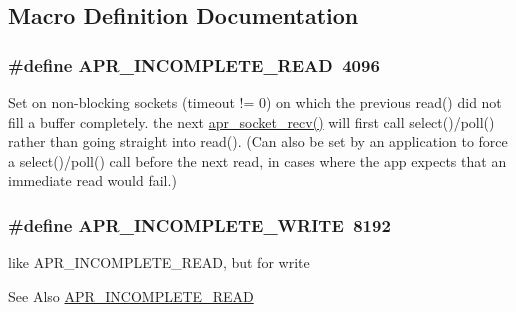\subsection{Macro Definition Documentation}
\hypertarget{group__apr__sockopt_ga73b6c80791c5148c2a416e03a8a1ff8a}{
\subsubsection[{A\-P\-R\-\_\-\-I\-N\-C\-O\-M\-P\-L\-E\-T\-E\-\_\-\-R\-E\-A\-D}]{\setlength{\rightskip}{0pt plus 5cm}\#define A\-P\-R\-\_\-\-I\-N\-C\-O\-M\-P\-L\-E\-T\-E\-\_\-\-R\-E\-A\-D~4096}}\label{group__apr__sockopt_ga73b6c80791c5148c2a416e03a8a1ff8a}
Set on non-\/blocking sockets (timeout != 0) on which the previous read() did not fill a buffer completely. the next \hyperlink{group__apr__network__io_gaa6ee00191f197f64b5a5409f4aff53d1}{apr\-\_\-socket\-\_\-recv()} will first call select()/poll() rather than going straight into read(). (Can also be set by an application to force a select()/poll() call before the next read, in cases where the app expects that an immediate read would fail.) \hypertarget{group__apr__sockopt_ga0c1544983845bf747b4a2a3facfb45e9}{
\subsubsection[{A\-P\-R\-\_\-\-I\-N\-C\-O\-M\-P\-L\-E\-T\-E\-\_\-\-W\-R\-I\-T\-E}]{\setlength{\rightskip}{0pt plus 5cm}\#define A\-P\-R\-\_\-\-I\-N\-C\-O\-M\-P\-L\-E\-T\-E\-\_\-\-W\-R\-I\-T\-E~8192}}\label{group__apr__sockopt_ga0c1544983845bf747b4a2a3facfb45e9}
like A\-P\-R\-\_\-\-I\-N\-C\-O\-M\-P\-L\-E\-T\-E\-\_\-\-R\-E\-A\-D, but for write \begin{DoxySeeAlso}{See Also}
\hyperlink{group__apr__sockopt_ga73b6c80791c5148c2a416e03a8a1ff8a}{A\-P\-R\-\_\-\-I\-N\-C\-O\-M\-P\-L\-E\-T\-E\-\_\-\-R\-E\-A\-D} 
\end{DoxySeeAlso}
